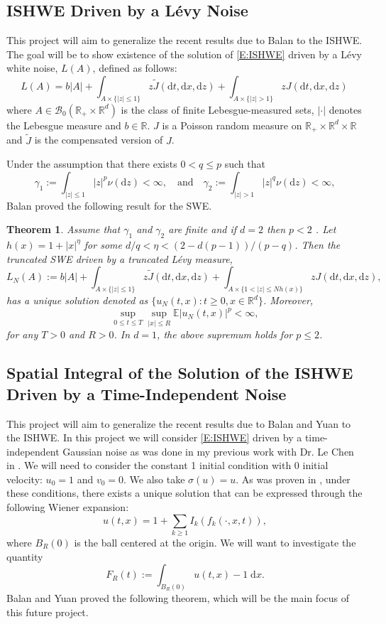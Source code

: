 \documentclass[a4paper,11pt]{article}
\numberwithin{equation}{section}
\theoremstyle{plain}
\newtheorem{theorem}{Theorem}[section]
\theoremstyle{definition}
\newcommand{\ud}{\ensuremath{\mathrm{d} }}
\newcommand{\R}{\mathbb{R}}
\numberwithin{NQ}{section}
\numberwithin{LQ}{section}
\numberwithin{ZQ}{section}
\begin{document}
\subsection{ISHWE Driven by a L\'evy Noise}
This project will aim to generalize the recent results due to Balan \cite{Balan22} to the ISHWE. The goal will be to show existence of the solution of \eqref{E:ISHWE} driven by a L\'evy white noise, $L(A)$, defined as follows:
	\[
		L(A) = b|A| + \int_{A \times \{|z| \le 1\}} z \tilde{J}(\ud t, \ud x, \ud z) +    \int_{A \times \{|z| > 1\}} z J(\ud t, \ud x, \ud z)\,
	\]
where $A \in \mathcal{B}_0(\R_{+}\times \R^d)$ is the class of finite Lebesgue-measured sets, $|\cdot|$ denotes the Lebesgue measure and $b \in \R$. $J$ is a Poisson random measure on $\R_+ \times \R^d \times \R$ and $\tilde{J}$ is the compensated version of $J$.

Under the assumption that there exists $0<q\le p$ such that 
	\[
		\gamma_1 := \int_{|z| \le 1} |z|^p \nu(\ud z) < \infty, \quad \text{and} \quad \gamma_2 := \int_{|z|>1} |z|^q \nu(\ud z) < \infty,
	\]
Balan \cite{Balan22} proved the following result for the SWE.
	\begin{theorem}
		Assume that $\gamma_1$ and $\gamma_2$ are finite and if $d=2$ then $ p <2$ . Let $h(x) = 1 + |x|^\eta$ for some $d/q < \eta < (2-d(p-1))/(p-q)$. Then the truncated SWE driven by a truncated L\'evy measure,
			\[
				L_N(A) := b|A| + \int_{A \times \{|z| \le 1\}} z \tilde{J}(\ud t, \ud x, \ud z) +    \int_{A \times \{1 < |z| \le Nh(x)\}} z J(\ud t, \ud x, \ud z),
			\]
		has a unique solution denoted as $\{ u_N(t,x): t \ge 0, x\in\R^d \}$. Moreover,	
			\[
				\sup_{0 \le t \le T}\sup_{|x| \le R} \mathbb{E}|u_N(t,x)|^p < \infty, 
			\]
		for any $T>0$ and $R>0$. In $d=1$, the above supremum holds for $p \le 2$. 
	\end{theorem}

\subsection{Spatial Integral of the Solution of the ISHWE Driven by a Time-Independent Noise}

This project will aim to generalize the recent results due to Balan and Yuan \cite{BY22} to the ISHWE. In this project we will consider \eqref{E:ISHWE} driven by a time-independent Gaussian noise as was done in my previous work with Dr. Le Chen in \cite{CE21}. We will need to consider the constant 1 initial condition with 0 initial velocity: $u_0 =1$ and $v_0 =0$. We also take $\sigma(u)=u$. As was proven in \cite[Theorem 1.6 and 3.3]{CE21}, under these conditions, there exists a unique solution that can be expressed through the following Wiener expansion:
	\[
		u(t,x) = 1 + \sum_{k \ge 1} I_k(f_k(\cdot,x,t)),
	\]
where $B_R(0)$ is the ball centered at the origin. We will want to investigate the quantity 
	\[
		F_R(t) := \int_{B_R(0)} u(t,x) -1 \; \ud x.
	\]
Balan and Yuan \cite{BY22} proved the following theorem, which will be the main focus of this future project. 
\end{document}
